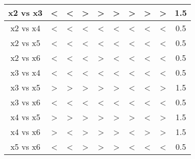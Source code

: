 \documentclass[a4paper,14pt]{extreport}
\begin{document}
\begin{table}[h!]
\begin{center}
\begin{tabular}{|c|ccccccc|c|c|}
    x2 vs x3          & \multicolumn{1}{c|}{<} & \multicolumn{1}{c|}{<} & \multicolumn{1}{c|}{>} & \multicolumn{1}{c|}{>} & \multicolumn{1}{c|}{>} & \multicolumn{1}{c|}{>} & > & >                                  & 1.5                               \\ \hline
    x2 vs x4          & \multicolumn{1}{c|}{<} & \multicolumn{1}{c|}{<} & \multicolumn{1}{c|}{<} & \multicolumn{1}{c|}{<} & \multicolumn{1}{c|}{<} & \multicolumn{1}{c|}{<} & < & <                                  & 0.5                               \\ \hline
    x2 vs x5          & \multicolumn{1}{c|}{<} & \multicolumn{1}{c|}{<} & \multicolumn{1}{c|}{<} & \multicolumn{1}{c|}{<} & \multicolumn{1}{c|}{<} & \multicolumn{1}{c|}{<} & < & <                                  & 0.5                               \\ \hline
    x2 vs x6          & \multicolumn{1}{c|}{<} & \multicolumn{1}{c|}{<} & \multicolumn{1}{c|}{<} & \multicolumn{1}{c|}{>} & \multicolumn{1}{c|}{<} & \multicolumn{1}{c|}{<} & < & <                                  & 0.5                               \\ \hline
    x3 vs x4          & \multicolumn{1}{c|}{<} & \multicolumn{1}{c|}{<} & \multicolumn{1}{c|}{<} & \multicolumn{1}{c|}{<} & \multicolumn{1}{c|}{<} & \multicolumn{1}{c|}{<} & < & <                                  & 0.5                               \\ \hline
    x3 vs x5          & \multicolumn{1}{c|}{>} & \multicolumn{1}{c|}{>} & \multicolumn{1}{c|}{>} & \multicolumn{1}{c|}{>} & \multicolumn{1}{c|}{>} & \multicolumn{1}{c|}{<} & < & >                                  & 1.5                               \\ \hline
    x3 vs x6          & \multicolumn{1}{c|}{<} & \multicolumn{1}{c|}{<} & \multicolumn{1}{c|}{<} & \multicolumn{1}{c|}{<} & \multicolumn{1}{c|}{<} & \multicolumn{1}{c|}{<} & < & <                                  & 0.5                               \\ \hline
    x4 vs x5          & \multicolumn{1}{c|}{>} & \multicolumn{1}{c|}{>} & \multicolumn{1}{c|}{>} & \multicolumn{1}{c|}{>} & \multicolumn{1}{c|}{>} & \multicolumn{1}{c|}{>} & < & >                                  & 1.5                               \\ \hline
    x4 vs x6          & \multicolumn{1}{c|}{>} & \multicolumn{1}{c|}{<} & \multicolumn{1}{c|}{>} & \multicolumn{1}{c|}{>} & \multicolumn{1}{c|}{>} & \multicolumn{1}{c|}{<} & > & >                                  & 1.5                               \\ \hline
    x5 vs x6          & \multicolumn{1}{c|}{<} & \multicolumn{1}{c|}{<} & \multicolumn{1}{c|}{>} & \multicolumn{1}{c|}{>} & \multicolumn{1}{c|}{>} & \multicolumn{1}{c|}{<} & < & <                                  & 0.5                               \\ \hline
    \end{tabular}
    \end{center} 
    \label{t3}
    \end{table}
\end{document}
